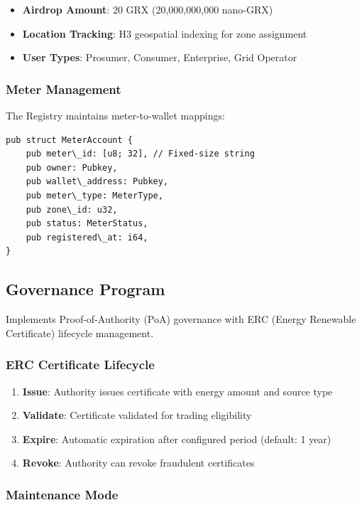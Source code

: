 \documentclass[conference]{IEEEtran}
\begin{document}
{\begin{itemize}
    \item \textbf{Airdrop Amount}: 20 GRX (20,000,000,000 nano-GRX)
    \item \textbf{Location Tracking}: H3 geospatial indexing for zone assignment
    \item \textbf{User Types}: Prosumer, Consumer, Enterprise, Grid Operator
\end{itemize}

\subsubsection{Meter Management}

The Registry maintains meter-to-wallet mappings:

\begin{lstlisting}[caption={Meter Registration Structure}]
pub struct MeterAccount {
    pub meter\_id: [u8; 32], // Fixed-size string
    pub owner: Pubkey,
    pub wallet\_address: Pubkey,
    pub meter\_type: MeterType,
    pub zone\_id: u32,
    pub status: MeterStatus,
    pub registered\_at: i64,
}
\end{lstlisting}

\subsection{Governance Program}

Implements Proof-of-Authority (PoA) governance with ERC (Energy Renewable Certificate) lifecycle management.

\subsubsection{ERC Certificate Lifecycle}

\begin{enumerate}
    \item \textbf{Issue}: Authority issues certificate with energy amount and source type
    \item \textbf{Validate}: Certificate validated for trading eligibility
    \item \textbf{Expire}: Automatic expiration after configured period (default: 1 year)
    \item \textbf{Revoke}: Authority can revoke fraudulent certificates
\end{enumerate}

\subsubsection{Maintenance Mode}

}
\end{document}
